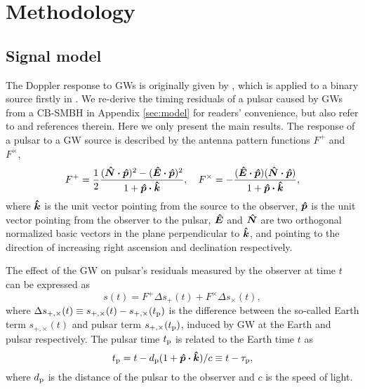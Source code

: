 \documentclass[times,tight]{aastex631}
\begin{document}
\section{Methodology}
\subsection{Signal model}
The Doppler response to GWs is originally given by \cite{estabrook1975}, which is applied to a binary source firstly in \cite{wahlquist1987}.
We re-derive the timing residuals of a pulsar caused by GWs from a CB-SMBH in Appendix \ref{sec:model} for readers' convenience, but also refer to \cite{aggarwal2019} and references therein.
Here we only present the main results.
The response of a pulsar to a GW source is described by the antenna pattern functions $F^{+}$ and $F^{\times}$,
\begin{equation}
    F^+ = \frac{1}{2} \frac{(\vu*{N}\vdot\vu*{p})^2 - (\vu*{E}\vdot\vu*{p})^2}{1 + \vu*{p}\vdot\vu*{k}} \qc
    F^{\times} = -\frac{(\vu*{E}\vdot\vu*{p})(\vu*{N}\vdot\vu*{p})}{1 + \vu*{p}\vdot\vu*{k}},
\end{equation}
where $\vu*{k}$ is the unit vector pointing from the source to the observer, $\vu*{p}$ is the unit vector pointing from the observer to the pulsar, $\vu*{E}$ and $\vu*{N}$ are two orthogonal normalized basic vectors in the plane perpendicular to $\vu*{k}$, and pointing to the direction of increasing right ascension and declination respectively.

The effect of the GW on pulsar's residuals measured by the observer at time $t$ can be expressed as
\begin{equation}
    s(t) = F^+ \Delta s_+(t) + F^{\times} \Delta s_{\times}(t),
\end{equation}
where $\Delta s_{+,\times}(t) \equiv s_{+,\times}(t) - s_{+,\times}(t_{\rm p})$ is the difference between the so-called Earth term $s_{+,\times}(t)$ and pulsar term $s_{+,\times}(t_{\rm p})$, induced by GW at the Earth and pulsar respectively.
The pulsar time $t_{\rm p}$ is related to the Earth time $t$ as
\begin{equation}
    t_{\rm p} = t - d_{\rm p} (1 + \vu*{p}\vdot\vu*{k})/c \equiv t - \tau_{\rm p},
\end{equation}
where $d_{\rm p}$ is the distance of the pulsar to the observer and $c$ is the speed of light.
\end{document}
